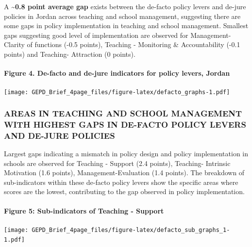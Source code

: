 \documentclass[twocolumn]{article}
\let\oldparagraph\paragraph
\renewcommand{\paragraph}[1]{\oldparagraph{#1}\mbox{}}
\begin{document}
A \textasciitilde{}\textbf{0.8 point average gap} exists between the
de-facto policy levers and de-jure policies in Jordan across teaching
and school management, suggesting there are some gaps in policy
implementation in teaching and school management. Smallest gaps
suggesting good level of implementation are observed for
Management-Clarity of functions (-0.5 points), Teaching - Monitoring \&
Accountability (-0.1 points) and Teaching- Attraction (0 points).

\hypertarget{figure-4.-de-facto-and-de-jure-indicators-for-policy-levers-jordan}{%
\paragraph{Figure 4. De-facto and de-jure indicators for policy levers,
Jordan}\label{figure-4.-de-facto-and-de-jure-indicators-for-policy-levers-jordan}}

\texttt{[image: GEPD\_Brief\_4page\_files/figure-latex/defacto\_graphs-1.pdf]}

\hypertarget{areas-in-teaching-and-school-management-with-highest-gaps-in-de-facto-policy-levers-and-de-jure-policies}{%
\subsubsection{\texorpdfstring{\textbf{AREAS IN TEACHING AND SCHOOL
MANAGEMENT WITH HIGHEST GAPS IN DE-FACTO POLICY LEVERS AND DE-JURE
POLICIES}}{AREAS IN TEACHING AND SCHOOL MANAGEMENT WITH HIGHEST GAPS IN DE-FACTO POLICY LEVERS AND DE-JURE POLICIES}}\label{areas-in-teaching-and-school-management-with-highest-gaps-in-de-facto-policy-levers-and-de-jure-policies}}

Largest gaps indicating a mismatch in policy design and policy
implementation in schools are observed for Teaching - Support (2.4
points), Teaching- Intrinsic Motivation (1.6 points),
Management-Evaluation (1.4 points). The breakdown of sub-indicators
within these de-facto policy levers show the specific areas where scores
are the lowest, contributing to the gap observed in policy
implementation. \vfill\null

\hypertarget{figure-5-sub-indicators-of-teaching---support}{%
\paragraph{Figure 5: Sub-indicators of Teaching -
Support}\label{figure-5-sub-indicators-of-teaching---support}}

\texttt{[image: GEPD\_Brief\_4page\_files/figure-latex/defacto\_sub\_graphs\_1-1.pdf]}
\end{document}
